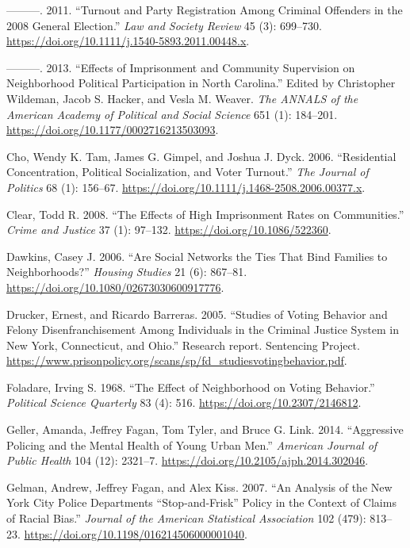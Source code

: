 \documentclass[]{article}
\begin{document}
\leavevmode\hypertarget{ref-Burch2011}{}%
---------. 2011. ``Turnout and Party Registration Among Criminal Offenders in the 2008 General Election.'' \emph{Law and Society Review} 45 (3): 699--730. \url{https://doi.org/10.1111/j.1540-5893.2011.00448.x}.

\leavevmode\hypertarget{ref-Burch2013}{}%
---------. 2013. ``Effects of Imprisonment and Community Supervision on Neighborhood Political Participation in North Carolina.'' Edited by Christopher Wildeman, Jacob S. Hacker, and Vesla M. Weaver. \emph{The ANNALS of the American Academy of Political and Social Science} 651 (1): 184--201. \url{https://doi.org/10.1177/0002716213503093}.

\leavevmode\hypertarget{ref-Cho2006}{}%
Cho, Wendy K. Tam, James G. Gimpel, and Joshua J. Dyck. 2006. ``Residential Concentration, Political Socialization, and Voter Turnout.'' \emph{The Journal of Politics} 68 (1): 156--67. \url{https://doi.org/10.1111/j.1468-2508.2006.00377.x}.

\leavevmode\hypertarget{ref-Clear2008}{}%
Clear, Todd R. 2008. ``The Effects of High Imprisonment Rates on Communities.'' \emph{Crime and Justice} 37 (1): 97--132. \url{https://doi.org/10.1086/522360}.

\leavevmode\hypertarget{ref-Dawkins2006}{}%
Dawkins, Casey J. 2006. ``Are Social Networks the Ties That Bind Families to Neighborhoods?'' \emph{Housing Studies} 21 (6): 867--81. \url{https://doi.org/10.1080/02673030600917776}.

\leavevmode\hypertarget{ref-Drucker2005}{}%
Drucker, Ernest, and Ricardo Barreras. 2005. ``Studies of Voting Behavior and Felony Disenfranchisement Among Individuals in the Criminal Justice System in New York, Connecticut, and Ohio.'' Research report. Sentencing Project. \url{https://www.prisonpolicy.org/scans/sp/fd_studiesvotingbehavior.pdf}.

\leavevmode\hypertarget{ref-Foladare1968}{}%
Foladare, Irving S. 1968. ``The Effect of Neighborhood on Voting Behavior.'' \emph{Political Science Quarterly} 83 (4): 516. \url{https://doi.org/10.2307/2146812}.

\leavevmode\hypertarget{ref-Geller2014}{}%
Geller, Amanda, Jeffrey Fagan, Tom Tyler, and Bruce G. Link. 2014. ``Aggressive Policing and the Mental Health of Young Urban Men.'' \emph{American Journal of Public Health} 104 (12): 2321--7. \url{https://doi.org/10.2105/ajph.2014.302046}.

\leavevmode\hypertarget{ref-Gelman2007}{}%
Gelman, Andrew, Jeffrey Fagan, and Alex Kiss. 2007. ``An Analysis of the New York City Police Departments ``Stop-and-Frisk'' Policy in the Context of Claims of Racial Bias.'' \emph{Journal of the American Statistical Association} 102 (479): 813--23. \url{https://doi.org/10.1198/016214506000001040}.
\end{document}
